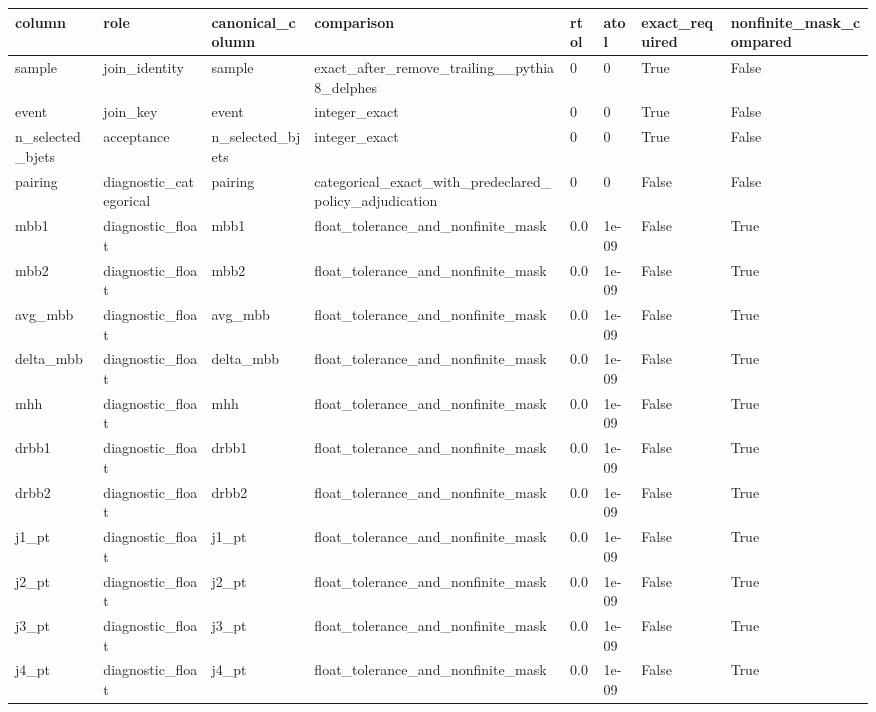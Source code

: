 \begin{tabular}{llllllll}
\toprule
column & role & canonical\_column & comparison & rtol & atol & exact\_required & nonfinite\_mask\_compared \\
\midrule
sample & join\_identity & sample & exact\_after\_remove\_trailing\_\_pythia8\_delphes & 0 & 0 & True & False \\
event & join\_key & event & integer\_exact & 0 & 0 & True & False \\
n\_selected\_bjets & acceptance & n\_selected\_bjets & integer\_exact & 0 & 0 & True & False \\
pairing & diagnostic\_categorical & pairing & categorical\_exact\_with\_predeclared\_policy\_adjudication & 0 & 0 & False & False \\
mbb1 & diagnostic\_float & mbb1 & float\_tolerance\_and\_nonfinite\_mask & 0.0 & 1e-09 & False & True \\
mbb2 & diagnostic\_float & mbb2 & float\_tolerance\_and\_nonfinite\_mask & 0.0 & 1e-09 & False & True \\
avg\_mbb & diagnostic\_float & avg\_mbb & float\_tolerance\_and\_nonfinite\_mask & 0.0 & 1e-09 & False & True \\
delta\_mbb & diagnostic\_float & delta\_mbb & float\_tolerance\_and\_nonfinite\_mask & 0.0 & 1e-09 & False & True \\
mhh & diagnostic\_float & mhh & float\_tolerance\_and\_nonfinite\_mask & 0.0 & 1e-09 & False & True \\
drbb1 & diagnostic\_float & drbb1 & float\_tolerance\_and\_nonfinite\_mask & 0.0 & 1e-09 & False & True \\
drbb2 & diagnostic\_float & drbb2 & float\_tolerance\_and\_nonfinite\_mask & 0.0 & 1e-09 & False & True \\
j1\_pt & diagnostic\_float & j1\_pt & float\_tolerance\_and\_nonfinite\_mask & 0.0 & 1e-09 & False & True \\
j2\_pt & diagnostic\_float & j2\_pt & float\_tolerance\_and\_nonfinite\_mask & 0.0 & 1e-09 & False & True \\
j3\_pt & diagnostic\_float & j3\_pt & float\_tolerance\_and\_nonfinite\_mask & 0.0 & 1e-09 & False & True \\
j4\_pt & diagnostic\_float & j4\_pt & float\_tolerance\_and\_nonfinite\_mask & 0.0 & 1e-09 & False & True \\
\bottomrule
\end{tabular}
